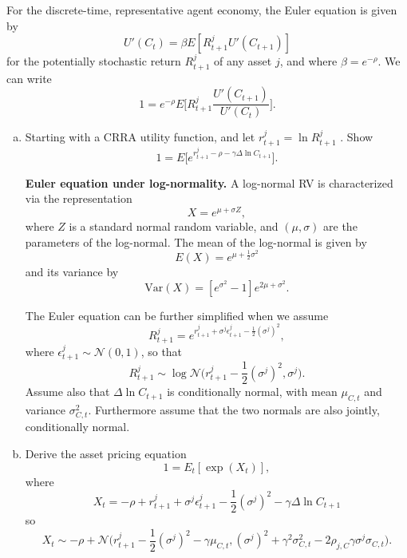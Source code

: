 \documentclass[11pt]{extarticle}
\theoremstyle{plain}
\theoremstyle{definition}
\begin{document}
For the discrete-time, representative agent economy, the Euler equation is given by
\begin{equation*}
	U'(C_t) = \beta E[R_{t+1}^j U'(C_{t+1})]
\end{equation*}
for the potentially stochastic return $R_{t+1}^j$ of any asset $j$, and where $\beta = e^{-\rho}$. We can write 
\begin{equation*}
	1 = e^{-\rho} E\bigg[R_{t+1}^j \frac{U'(C_{t+1})}{U'(C_t)} \bigg].
\end{equation*}
\begin{enumerate}[(a)]
\item Starting with a CRRA utility function, and let $r_{t+1}^j = \ln R_{t+1}^j$ . Show 
\begin{equation*}
	1 = E\bigg[ e^{r_{t+1}^j - \rho -\gamma \Delta \ln  C_{t+1}} \bigg].
\end{equation*}




\vspace{5mm}
\noindent
\textbf{Euler equation under log-normality.} A log-normal RV is characterized via the representation
\begin{equation*}
	X = e^{\mu + \sigma Z},
\end{equation*}
where $Z$ is a standard normal random variable, and $(\mu,\sigma)$ are the parameters of the log-normal. The mean of the log-normal is given by
\begin{equation*}
	E(X) = e^{\mu + \frac{1}{2} \sigma^2}
\end{equation*}
and its variance by
\begin{equation*}
	\text{Var}(X) = [e^{\sigma^2}-1] e^{2\mu + \sigma^2}.
\end{equation*}


The Euler equation can be further simplified when we assume
\begin{equation*}
	R_{t+1}^j = e^{r_{t+1}^j + \sigma^j \epsilon_{t+1}^j - \frac{1}{2} (\sigma^j)^2},
\end{equation*}
where $\epsilon_{t+1}^j \sim \mathcal{N}(0,1)$, so that 
\begin{equation*}
	R_{t+1}^j  \sim \log \mathcal{N} \bigg(r_{t+1}^j - \frac{1}{2} (\sigma^j)^2, \sigma^j\bigg).
\end{equation*}
Assume also that $\Delta \ln  C_{t+1}$ is conditionally normal, with mean $\mu_{C,t}$ and variance $\sigma_{C,t}^2$. Furthermore assume that the two normals are also jointly, conditionally normal.

\item Derive the asset pricing equation
\begin{equation*}
	1 = E_t [\exp(X_t)],
\end{equation*}
where 
\begin{equation*}
	X_t = -\rho + r_{t+1}^j + \sigma^j \epsilon_{t+1}^j - \frac{1}{2} (\sigma^j)^2 - \gamma \Delta \ln C_{t+1} 
\end{equation*}
so
\begin{equation*}
X_t \sim -\rho + \mathcal{N}\bigg(r_{t+1}^j - \frac{1}{2} (\sigma^j)^2 - \gamma \mu_{C,t}, (\sigma^j)^2 + \gamma^2 \sigma_{C,t}^2 - 2 \rho_{j,C} \gamma \sigma^j \sigma_{C,t} \bigg).
\end{equation*}


\end{enumerate}
\end{document}
